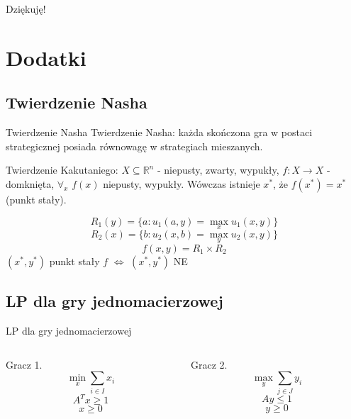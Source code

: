 \documentclass[xcolor=x11names,compress]{beamer}
\renewcommand{\(}{\begin{columns}}
\renewcommand{\)}{\end{columns}}
\newcommand{\<}[1]{\begin{column}{#1}}
\renewcommand{\>}{\end{column}}
\begin{document}

\begin{frame}
\begin{center}
{\LARGE Dziękuję!}
\end{center}
\end{frame}


\appendix
\section{Dodatki}

\subsection{Twierdzenie Nasha}
\begin{frame}{Twierdzenie Nasha}
Twierdzenie Nasha: każda skończona gra w postaci strategicznej posiada
równowagę w strategiach mieszanych.

\bigskip

Twierdzenie Kakutaniego: $X \subseteq \mathbb{R}^n$ - niepusty, zwarty,
wypukły, $f: X \rightarrow X$ - domknięta, $\forall_x$ $f(x)$ niepusty, wypukły.
Wówczas istnieje $x^*$, że $f(x^*) = x^*$ (punkt stały).

\bigskip

$$R_1(y) = \{ a: u_1(a,y) = \max_x u_1(x,y) \}$$
$$R_2(x) = \{ b: u_2(x,b) = \max_y u_2(x,y) \}$$
$$f(x,y) = R_1 \times R_2$$
$(x^*,y^*)$ punkt stały $f$ $\iff$ $(x^*,y^*)$ NE
\end{frame}

\subsection{LP dla gry jednomacierzowej}
\begin{frame}{LP dla gry jednomacierzowej}
\begin{columns}[c]
\begin{column}{.5\textwidth}
\begin{center}
Gracz 1.
$$\min_x \sum_{i \in I} x_i$$
$$A^Tx \geq 1$$
$$x \geq 0$$
\end{center}
\end{column}
\begin{column}{.5\textwidth}
\begin{center}
Gracz 2.
$$\max_y \sum_{j \in J} y_i$$
$$Ay \leq 1 $$
$$y \geq 0$$
\end{center}
\end{column}
\end{columns}
\end{frame}
\end{document}
